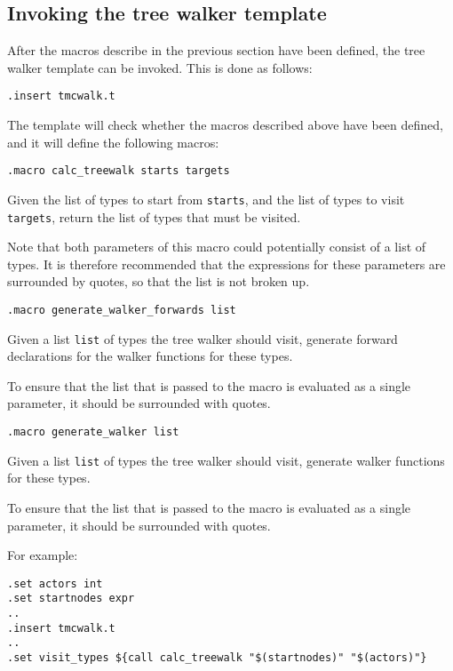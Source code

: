 \subsection{Invoking the tree walker template}
After the macros describe in the previous section have been defined,
the tree walker template can be invoked. This is done as follows:
\begin{verbatim}
.insert tmcwalk.t
\end{verbatim}
The template will check whether the macros described above have been
defined, and it will define the following macros:
\begin{verbatim}
.macro calc_treewalk starts targets
\end{verbatim}
\begin{desc}
Given the list of types to start from {\tt starts}, and the list of types
to visit {\tt targets}, return the list of types that must be visited.
\par
Note that both parameters of this macro could potentially consist of
a list of types. It is therefore recommended that the expressions
for these parameters are surrounded by quotes, so that the list is not
broken up.

\end{desc}
\begin{verbatim}
.macro generate_walker_forwards list
\end{verbatim}
\begin{desc}
Given a list {\tt list} of types the tree walker should visit, generate
forward declarations for the walker functions for these types. 
\par
To ensure that the list that is passed to the macro is evaluated as
a single parameter, it should be surrounded with quotes.
\end{desc}
\begin{verbatim}
.macro generate_walker list
\end{verbatim}
\begin{desc}
Given a list {\tt list} of types the tree walker should visit, generate
walker functions for these types.
\par
To ensure that the list that is passed to the macro is evaluated as
a single parameter, it should be surrounded with quotes.
\end{desc}
For example:
\begin{verbatim}
.set actors int
.set startnodes expr
..
.insert tmcwalk.t
..
.set visit_types ${call calc_treewalk "$(startnodes)" "$(actors)"}
\end{verbatim}
